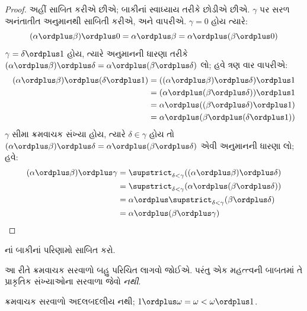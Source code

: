 \begin{proof}
અહીં  સાબિત કરીએ છીએ; બાકીનાં
સ્વાધ્યાય તરીકે છોડીએ છીએ. $\gamma$ પર સરળ
અનંતાતીત અનુમાનથી સાબિતી કરીએ, અને
 વાપરીએ. $\gamma = 0$
હોય ત્યારે:
\[
(\alpha \ordplus  \beta) \ordplus  0 = \alpha \ordplus  \beta  = \alpha \ordplus  (\beta \ordplus  0)
\]
$\gamma = \delta\ordplus 1$ હોય, ત્યારે અનુમાનની
ધારણા તરીકે $(\alpha
\ordplus  \beta) \ordplus  \delta = \alpha \ordplus  (\beta \ordplus
\delta)$ લો; હવે  ત્રણ વાર વાપરીએ:
\begin{align*}
	(\alpha \ordplus  \beta) \ordplus  (\delta \ordplus  1) & = ((\alpha \ordplus  \beta) \ordplus  \delta)\ordplus 1\\
	& = (\alpha \ordplus  (\beta \ordplus  \delta)) \ordplus  1\\
	& = \alpha \ordplus  ((\beta \ordplus  \delta)\ordplus 1)\\
	& = \alpha \ordplus  (\beta \ordplus  (\delta\ordplus 1))
\end{align*}
$\gamma$ સીમા ક્રમવાચક સંખ્યા હોય, ત્યારે
$\delta \in \gamma$ હોય તો $(\alpha \ordplus  \beta) \ordplus  \delta =
\alpha \ordplus  (\beta \ordplus  \delta)$ એવી
અનુમાનની ધારણા લો; હવે:
\begin{align*}
	(\alpha \ordplus  \beta) \ordplus  \gamma & = \supstrict_{\delta < \gamma}((\alpha \ordplus  \beta) \ordplus  \delta) \\
	&= \supstrict_{\delta < \gamma}(\alpha \ordplus  (\beta \ordplus  \delta))\\
	&= \alpha \ordplus  \supstrict_{\delta < \gamma}(\beta \ordplus  \delta)\\
	& = \alpha \ordplus  (\beta \ordplus  \gamma)
\end{align*}
\end{proof}

\begin{prob}
નાં
બાકીનાં પરિણામો સાબિત કરો.
\end{prob}

આ રીતે ક્રમવાચક સરવાળો બહુ પરિચિત લાગવો જોઈએ.
પરંતુ એક મહત્ત્વની બાબતમાં તે પ્રાકૃતિક સંખ્યાઓના
સરવાળા જેવો \emph{નથી}.

\begin{prop}
ક્રમવાચક સરવાળો {અદલબદલીય નથી};
$1 \ordplus  \omega = \omega <
\omega \ordplus  1$.
\end{prop}

